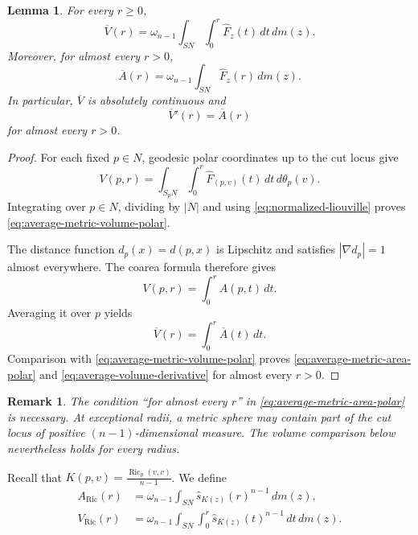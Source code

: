 \documentclass[11pt, reqno]{amsart}
\newtheorem{lemma}{Lemma}
\newtheorem{remark}{Remark}
\begin{document}
\begin{lemma}\label{lem:average-metric-polar}
For every $r\ge 0$,
\begin{equation}\label{eq:average-metric-volume-polar}
\overline V(r)
=\omega_{n-1}\int_{SN}\int_0^r \widehat F_z(t)\, dt\, dm(z).
\end{equation}
Moreover, for almost every $r>0$,
\begin{equation}\label{eq:average-metric-area-polar}
\overline A(r)
=\omega_{n-1}\int_{SN}\widehat F_z(r)\, dm(z).
\end{equation}
In particular, $\overline V$ is absolutely continuous and
\begin{equation}\label{eq:average-volume-derivative}
\overline V'(r)=\overline A(r)
\end{equation}
for almost every $r>0$.
\end{lemma}

\begin{proof}
For each fixed $p\in N$, geodesic polar coordinates up to the cut locus give
$$
V(p, r) = \int_{S_pN}\int_0^r \widehat F_{(p, v)}(t)\, dt\, d\theta_p(v).
$$
Integrating over $p\in N$, dividing by $|N|$ and using \eqref{eq:normalized-liouville} proves \eqref{eq:average-metric-volume-polar}.

The distance function $d_p(x)=d(p, x)$ is Lipschitz and satisfies
$|\nabla d_p|=1$ almost everywhere. The coarea formula
therefore gives
$$V(p, r)=\int_0^r A(p, t)\, dt. $$
Averaging it over $p$ yields
$$\overline V(r)=\int_0^r \overline A(t)\, dt. $$
Comparison with \eqref{eq:average-metric-volume-polar} proves
\eqref{eq:average-metric-area-polar} and
\eqref{eq:average-volume-derivative} for almost every $r>0$.
\end{proof}
\begin{remark}
The condition ``for almost every $r$'' in \eqref{eq:average-metric-area-polar} is necessary. At exceptional radii, a metric sphere may contain part of the cut locus of positive $(n-1)$-dimensional measure. The volume comparison below nevertheless holds for every radius.
\end{remark}

Recall that $K(p, v)=\frac{\operatorname{Ric}_p(v, v)}{n-1}$. We define
\begin{align}
A_{\operatorname{Ric}}(r)
& =
\omega_{n-1}\int_{SN}
\widehat s_{K(z)}(r)^{n-1}\, dm(z),
\label{eq:directional-Ricci-area}\\
V_{\operatorname{Ric}}(r)
& =
\omega_{n-1}\int_{SN}\int_0^r
\widehat s_{K(z)}(t)^{n-1}\, dt\, dm(z).
\label{eq:directional-Ricci-volume}
\end{align}
\end{document}

